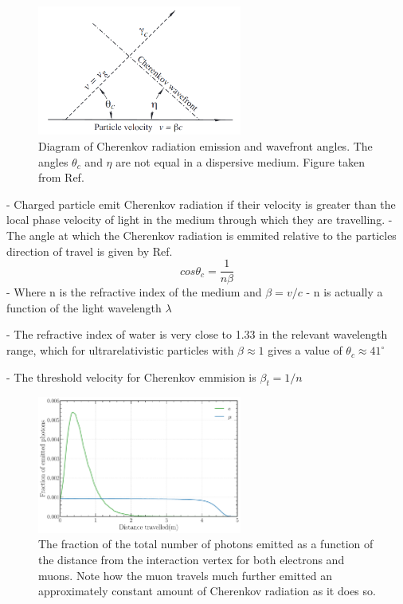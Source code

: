 \begin{figure} %
    \includegraphics[width=0.6\textwidth]{diagrams/4-chips/cherenkov.png}
    \caption[Diagram of Cherenkov radiation.]
    {Diagram of Cherenkov radiation emission and wavefront angles. The angles $\theta_{c}$ and
        $\eta$ are not equal in a dispersive medium. Figure taken from Ref.~\cite{particle2020}
    }
    \label{fig:cherenkov}
\end{figure}

- Charged particle emit Cherenkov radiation if their velocity is greater than the local phase
velocity of light in the medium through which they are travelling.
- The angle at which the Cherenkov radiation is emmited relative to the particles direction of
travel is given by Ref.~\cite{particle2020}
\begin{equation}
    cos\theta_{c} = \frac{1}{n\beta}
\end{equation}
- Where n is the refractive index of the medium and $\beta=v/c$
- n is actually a function of the light wavelength $\lambda$

- The refractive index of water is very close to 1.33 in the relevant wavelength range, which for
ultrarelativistic particles with $\beta\approx 1$ gives a value of $\theta_{c}\approx 41^{\circ}$

- The threshold velocity for Cherenkov emmision is $\beta_{t}=1/n$

\begin{figure} %
    \includegraphics[width=0.6\textwidth]{diagrams/4-chips/emission_distance.pdf}
    \caption[Fraction of Cherenkov photons emitted as a function of distance.]
    {The fraction of the total number of photons emitted as a function of the distance from the
        interaction vertex for both electrons and muons. Note how the muon travels much further
        emitted an approximately constant amount of Cherenkov radiation as it does so.}
    \label{fig:emission distance}
\end{figure}

